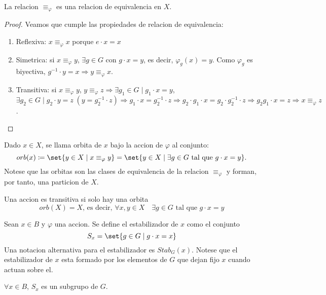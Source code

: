 \begin{proposition}
	La relacion \(\equiv_\varphi\) es una relacion de equivalencia en \(X \).
\end{proposition}
\begin{proof}
	Veamos que cumple las propiedades de relacion de equivalencia:
	\begin{enumerate}
		\item Reflexiva: \(x \equiv_\varphi x \) porque \(e \cdot x = x \)
		\item Simetrica: si \(x \equiv_\varphi y \), \(\exists g \in G 	\) con \(g \cdot x  = y \), es decir, \(\varphi_g (x) = y \). Como \(\varphi_g \) es biyectiva,  \(g^{-1} \cdot y = x \Rightarrow y \equiv_\varphi x \).
		\item Transitiva: si \(x \equiv_\varphi y \), \(y \equiv_\varphi z \Rightarrow \exists g_1 \in G \mid g_1 \cdot x = y\), \(\exists g_2 \in G \mid g_2 \cdot y = z \;(y = g^{-1}_2 \cdot z) \Rightarrow g_1  \cdot x = g^{-1}_2 \cdot z \Rightarrow g_2 \cdot g_1 \cdot x = g_2 \cdot g^{-1}_2 \cdot z \Rightarrow g_2 g_1 \cdot x = z \Rightarrow x \equiv_\varphi z\).
	\end{enumerate}
\end{proof}
\begin{definition}
	Dado \(x \in X \), se llama orbita de \(x \) bajo la accion de \(\varphi\) al conjunto:
	\[
		orb(x) \coloneqq \set{y \in X \mid x \equiv_\varphi y} = \set{y \in X \mid \exists g \in G \text{ tal que } g \cdot x = y  }.
	\]
	Notese que las orbitas son las clases de equivalencia de la relacion \(\equiv_\varphi\) y forman, por tanto, una particion de \(X \).
\end{definition}
\begin{definition}
	Una accion es transitiva si solo hay una orbita
	\[
		orb(X) = X \text{, es decir, } \forall x,y \in X \quad \exists g \in G \text{ tal que } g \cdot x = y
	\]
\end{definition}
\begin{definition}
	Sean \(x \in B \) y \(\varphi\) una accion. Se define el estabilizador de \(x \) como el conjunto
	\[
		S_x = \set{g \in G \mid g \cdot x = x }
	\]
	Una notacion alternativa para el estabilizador es \(Stab_G(x )\). Notese que el estabilizador de \(x \) esta formado por los elementos de \(G \) que dejan fijo \(x \) cuando actuan sobre el.
\end{definition}
\begin{proposition}
	\(\forall x \in B \), \(S_x \) es un subgrupo de \(G \).
\end{proposition}
